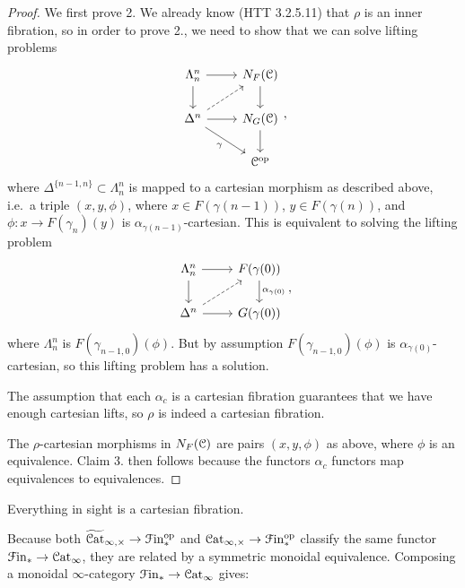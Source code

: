 \documentclass[main.tex]{subfiles}
\begin{document}
\begin{proof}
  We first prove 2. We already know (HTT 3.2.5.11) that $\rho$ is an inner fibration, so in order to prove 2., we need to show that we can solve lifting problems
  \begin{equation*}
    \begin{tikzcd}
      \Lambda^{n}_{n}
      \arrow[r]
      \arrow[d]
      & N_{F}(\category{C})
      \arrow[d]
      \\
      \Delta^{n}
      \arrow[r]
      \arrow[ur, dashed]
      \arrow[dr, swap, "\gamma"]
      & N_{G}(\category{C})
      \arrow[d]
      \\
      & \category{C}\op
    \end{tikzcd},
  \end{equation*}
  where $\Delta^{\{n-1, n\}} \subset \Lambda^{n}_{n}$ is mapped to a cartesian morphism as described above, i.e.\ a triple $(x, y, \phi)$, where $x \in F(\gamma(n-1))$, $y \in F(\gamma(n))$, and $\phi\colon x \to F(\gamma_{n})(y)$ is $\alpha_{\gamma(n-1)}$-cartesian. This is equivalent to solving the lifting problem
  \begin{equation*}
    \begin{tikzcd}
      \Lambda^{n}_{n}
      \arrow[r]
      \arrow[d]
      & F(\gamma(0))
      \arrow[d, "\alpha_{\gamma(0)}"]
      \\
      \Delta^{n}
      \arrow[r]
      \arrow[ur, dashed]
      & G(\gamma(0))
    \end{tikzcd},
  \end{equation*}
  where $\Lambda^{n}_{n}$ is $F(\gamma_{n-1, 0})(\phi)$. But by assumption $F(\gamma_{n-1, 0})(\phi)$ is $\alpha_{\gamma(0)}$-cartesian, so this lifting problem has a solution.

  The assumption that each $\alpha_{c}$ is a cartesian fibration guarantees that we have enough cartesian lifts, so $\rho$ is indeed a cartesian fibration.

  The $\rho$-cartesian morphisms in $N_{F}(\mathcal{C})$ are pairs $(x, y, \phi)$ as above, where $\phi$ is an equivalence. Claim 3. then follows because the functors $\alpha_{c}$ functors map equivalences to equivalences.
\end{proof}

\begin{corollary}
  Everything in sight is a cartesian fibration.
\end{corollary}

Because both $\widetilde{\mathcal{C}\mathrm{at}}_{\infty,\times} \to \mathcal{F}\mathrm{in}_{*}^{\mathrm{op}}$ and $\mathcal{C}\mathrm{at}_{\infty,\times} \to \mathcal{F}\mathrm{in}_{*}^{\mathrm{op}}$ classify the same functor $\mathcal{F}\mathrm{in}_{*} \to \mathcal{C}\mathrm{at}_{\infty}$, they are related by a symmetric monoidal equivalence. Composing a monoidal $\infty$-category $\mathcal{F}\mathrm{in}_{*} \to \mathcal{C}\mathrm{at}_{\infty}$ gives:
\end{document}
